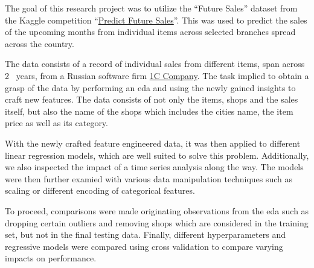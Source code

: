 The goal of this research project was to utilize the \enquote{Future Sales} dataset from the Kaggle competition \enquote{\href{https://www.kaggle.com/c/competitive-data-science-predict-future-sales}{Predict Future Sales}}.
This was used to predict the sales of the upcoming months from individual items across selected branches spread across the country.

The data consists of a record of individual sales from different items, span across 2 \textonehalf \ years, from a Russian software firm \href{https://1c.ru/eng/title.htm}{1C Company}.
The task implied to obtain a grasp of the data by performing an \acrfull{eda} and using the newly gained insights to craft new features.
The data consists of not only the items, shops and the sales itself, but also the name of the shops which includes the cities name, the item price as well as its category.

With the newly crafted feature engineered data, it was then applied to different linear regression models, which are well suited to solve this problem.
Additionally, we also inspected the impact of a time series analysis along the way.
The models were then further examied with various data manipulation techniques such as scaling or different encoding of categorical features.

To proceed, comparisons were made originating observations from the \acrshort{eda} such as dropping certain outliers and removing shops which are considered in the training set, but not in the final testing data.
Finally, different hyperparameters and regressive models were compared using cross validation to compare varying impacts on performance.

